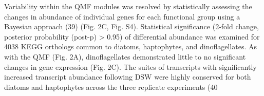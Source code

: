 Variability within the QMF modules was resolved by statistically assessing the changes in abundance of individual genes for each functional group using a Bayesian approach (39) (Fig. 2C, Fig. S4). Statistical significance (2-fold change, posterior probability (post-p) > 0.95) of differential abundance was examined for 4038 KEGG orthologs common to diatoms, haptophytes, and dinoflagellates. As with the QMF (Fig. 2A), dinoflagellates demonstrated little to no significant changes in gene expression (Fig. 2C). The suites of transcripts with significantly increased transcript abundance following DSW were highly conserved for both diatoms and haptophytes across the three replicate experiments (40%
